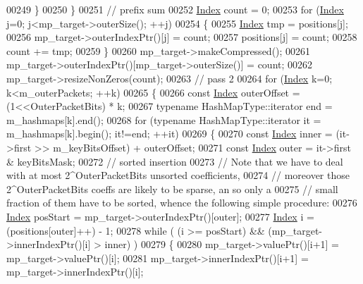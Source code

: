 \begin{DoxyCode}
00249           \}
00250         \}
00251         \textcolor{comment}{// prefix sum}
00252         \hyperlink{namespace_eigen_a62e77e0933482dafde8fe197d9a2cfde}{Index} count = 0;
00253         \textcolor{keywordflow}{for} (\hyperlink{namespace_eigen_a62e77e0933482dafde8fe197d9a2cfde}{Index} j=0; j<mp\_target->outerSize(); ++j)
00254         \{
00255           \hyperlink{namespace_eigen_a62e77e0933482dafde8fe197d9a2cfde}{Index} tmp = positions[j];
00256           mp\_target->outerIndexPtr()[j] = count;
00257           positions[j] = count;
00258           count += tmp;
00259         \}
00260         mp\_target->makeCompressed();
00261         mp\_target->outerIndexPtr()[mp\_target->outerSize()] = count;
00262         mp\_target->resizeNonZeros(count);
00263         \textcolor{comment}{// pass 2}
00264         \textcolor{keywordflow}{for} (\hyperlink{namespace_eigen_a62e77e0933482dafde8fe197d9a2cfde}{Index} k=0; k<m\_outerPackets; ++k)
00265         \{
00266           \textcolor{keyword}{const} \hyperlink{namespace_eigen_a62e77e0933482dafde8fe197d9a2cfde}{Index} outerOffset = (1<<OuterPacketBits) * k;
00267           \textcolor{keyword}{typename} HashMapType::iterator end = m\_hashmaps[k].end();
00268           \textcolor{keywordflow}{for} (\textcolor{keyword}{typename} HashMapType::iterator it = m\_hashmaps[k].begin(); it!=end; ++it)
00269           \{
00270             \textcolor{keyword}{const} \hyperlink{namespace_eigen_a62e77e0933482dafde8fe197d9a2cfde}{Index} inner = (it->first >> m\_keyBitsOffset) + outerOffset;
00271             \textcolor{keyword}{const} \hyperlink{namespace_eigen_a62e77e0933482dafde8fe197d9a2cfde}{Index} outer = it->first & keyBitsMask;
00272             \textcolor{comment}{// sorted insertion}
00273             \textcolor{comment}{// Note that we have to deal with at most 2^OuterPacketBits unsorted coefficients,}
00274             \textcolor{comment}{// moreover those 2^OuterPacketBits coeffs are likely to be sparse, an so only a}
00275             \textcolor{comment}{// small fraction of them have to be sorted, whence the following simple procedure:}
00276             \hyperlink{namespace_eigen_a62e77e0933482dafde8fe197d9a2cfde}{Index} posStart = mp\_target->outerIndexPtr()[outer];
00277             \hyperlink{namespace_eigen_a62e77e0933482dafde8fe197d9a2cfde}{Index} i = (positions[outer]++) - 1;
00278             \textcolor{keywordflow}{while} ( (i >= posStart) && (mp\_target->innerIndexPtr()[i] > inner) )
00279             \{
00280               mp\_target->valuePtr()[i+1] = mp\_target->valuePtr()[i];
00281               mp\_target->innerIndexPtr()[i+1] = mp\_target->innerIndexPtr()[i];

\end{DoxyCode}
